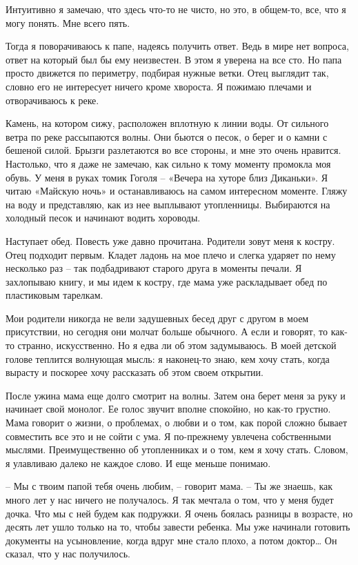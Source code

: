 \documentclass[
]{book}
\begin{document}
Интуитивно я замечаю, что здесь что-то не чисто, но это, в общем-то, все, что я могу понять. Мне всего пять.

Тогда я поворачиваюсь к папе, надеясь получить ответ. Ведь в мире нет вопроса, ответ на который был бы ему неизвестен. В этом я уверена на все сто. Но папа просто движется по периметру, подбирая нужные ветки. Отец выглядит так, словно его не интересует ничего кроме хвороста. Я пожимаю плечами и отворачиваюсь к реке.

Камень, на котором сижу, расположен вплотную к линии воды. От сильного ветра по реке рассыпаются волны. Они бьются о песок, о берег и о камни с бешеной силой. Брызги разлетаются во все стороны, и мне это очень нравится. Настолько, что я даже не замечаю, как сильно к тому моменту промокла моя обувь. У меня в руках томик Гоголя -- «Вечера на хуторе близ Диканьки». Я читаю «Майскую ночь» и останавливаюсь на самом интересном моменте. Гляжу на воду и представляю, как из нее выплывают утопленницы. Выбираются на холодный песок и начинают водить хороводы.

Наступает обед. Повесть уже давно прочитана. Родители зовут меня к костру. Отец подходит первым. Кладет ладонь на мое плечо и слегка ударяет по нему несколько раз -- так подбадривают старого друга в моменты печали. Я захлопываю книгу, и мы идем к костру, где мама уже раскладывает обед по пластиковым тарелкам.

Мои родители никогда не вели задушевных бесед друг с другом в моем присутствии, но сегодня они молчат больше обычного. А если и говорят, то как-то странно, искусственно. Но я едва ли об этом задумываюсь. В моей детской голове теплится волнующая мысль: я наконец-то знаю, кем хочу стать, когда вырасту и поскорее хочу рассказать об этом своем открытии.

После ужина мама еще долго смотрит на волны. Затем она берет меня за руку и начинает свой монолог. Ее голос звучит вполне спокойно, но как-то грустно. Мама говорит о жизни, о проблемах, о любви и о том, как порой сложно бывает совместить все это и не сойти с ума. Я по-прежнему увлечена собственными мыслями. Преимущественно об утопленниках и о том, кем я хочу стать. Словом, я улавливаю далеко не каждое слово. И еще меньше понимаю.

-- Мы с твоим папой тебя очень любим, -- говорит мама. -- Ты же знаешь, как много лет у нас ничего не получалось. Я так мечтала о том, что у меня будет дочка. Что мы с ней будем как подружки. Я очень боялась разницы в возрасте, но десять лет ушло только на то, чтобы завести ребенка. Мы уже начинали готовить документы на усыновление, когда вдруг мне стало плохо, а потом доктор\ldots{} Он сказал, что у нас получилось.
\end{document}

